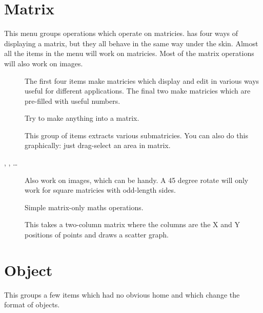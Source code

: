 \section{Matrix}

This menu groups operations which operate on matricies. \nip{} has four ways
of displaying a matrix, but they all behave in the same way under the skin.
Almost all the items in the  menu will work on matricies. Most of the
matrix operations will also work on images.

\begin{description}

\item[]
	The first four items make matricies which display and edit in various 
	ways useful for different applications. The final two make matricies
	which are pre-filled with useful numbers.

\item[]
	Try to make anything into a matrix.

\item[]
	This group of items extracts various submatricies. You can also do
	this graphically: just drag-select an area in matrix.

\item[, , \ldots]
	Also work on images, which can be handy.
	A 45 degree rotate will only work for square matricies with
	odd-length sides.

\item[]
	Simple matrix-only maths operations.

\item[]
	This takes a two-column matrix where the columns are the X and Y
	positions of points and draws a scatter graph.

\end{description}

\section{Object}

This groups a few items which had no obvious home and which change the format
of objects.

